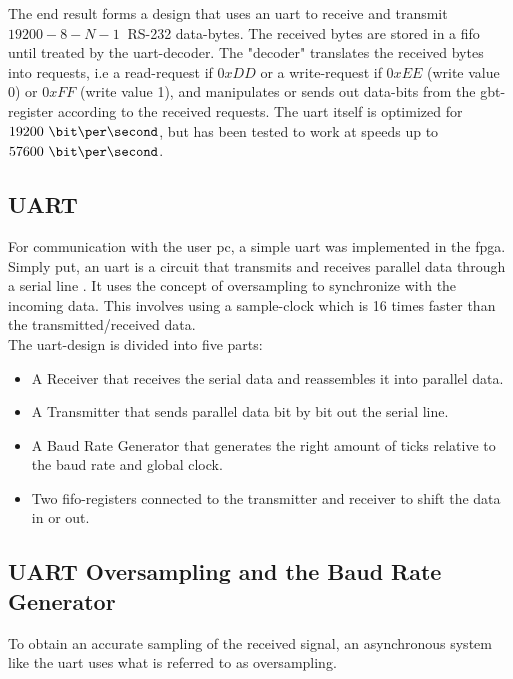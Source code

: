 \documentclass[main.tex]{subfiles}
\begin{document}
The end result forms a design that uses an \gls{uart} to receive and transmit $19200-8-N-1~$ RS-232 data-bytes. The received bytes are stored in a \gls{fifo} until treated by the \gls{uart}-decoder. The "decoder" translates the received bytes into requests, i.e a read-request if $0xDD$ or a write-request if $0xEE$ (write value 0) or $0xFF$ (write value 1), and manipulates or sends out data-bits from the \gls{gbt}-register according to the received requests. The \gls{uart} itself is optimized for $19200~\bit\per\second$, but has been tested to work at speeds up to $57600~\bit\per\second$.

\subsection{UART}
For communication with the user \acrshort{pc}, a simple \gls{uart} was implemented in the \gls{fpga}.\\
Simply put, an \gls{uart} is a circuit that transmits and receives parallel data through a serial line \cite{chu08}. It uses the concept of oversampling to synchronize with the incoming data. This involves using a sample-clock which is 16 times faster than the transmitted/received data.\\

The \gls{uart}-design is divided into five parts:
\begin{itemize}
\item A Receiver that receives the serial data and reassembles it into parallel data.
\item A Transmitter that sends parallel data bit by bit out the serial line.
\item A Baud Rate Generator that generates the right amount of ticks relative to the baud rate and global clock.
\item Two \gls{fifo}-registers connected to the transmitter and receiver to shift the data in or out.
\end{itemize}

\subsection{UART Oversampling and the Baud Rate Generator}

To obtain an accurate sampling of the received signal, an asynchronous system like the \gls{uart} uses what is referred to as oversampling. \\
\end{document}

